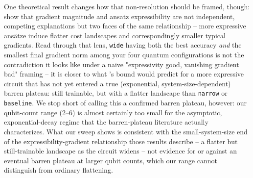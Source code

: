 One theoretical result changes how that non-resolution should be framed,
though: \citet{holmes2022expressibility} show that gradient magnitude and
ansatz expressibility are not independent, competing explanations but two
faces of the same relationship -- more expressive ansätze induce flatter
cost landscapes and correspondingly smaller typical gradients. Read
through that lens, \texttt{wide} having both the best accuracy \emph{and}
the smallest final gradient norm among your four quantum configurations is
not the contradiction it looks like under a naive "expressivity good,
vanishing gradient bad" framing -- it is closer to what
\citet{holmes2022expressibility}'s bound would predict for a more
expressive circuit that has not yet entered a true (exponential,
system-size-dependent) barren plateau: still trainable, but with a flatter
landscape than \texttt{narrow} or \texttt{baseline}. We stop short of
calling this a confirmed barren plateau, however: our qubit-count range
(2--6) is almost certainly too small for the asymptotic, exponential-decay
regime that the barren-plateau literature
\citep{mcclean2018barren,holmes2022expressibility} actually characterizes.
What our sweep shows is consistent with the small-system-size end of the
expressibility-gradient relationship those results describe -- a flatter
but still-trainable landscape as the circuit widens -- not evidence for or
against an eventual barren plateau at larger qubit counts, which our range
cannot distinguish from ordinary flattening.

